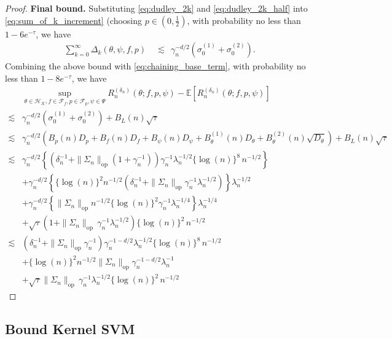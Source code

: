 \documentclass[12pt]{article}
\newcommand{\E}{\mathbb{E}}
\begin{document}
\begin{proof}
\noindent\textbf{Final bound.}
Substituting \eqref{eq:dudley_2k} and \eqref{eq:dudley_2k_half} into \eqref{eq:sum_of_k_increment} (choosing $p\in(0,\frac{1}{2})$, with probability no less than $1-6e^{-\tau}$, we have 
\begin{align*}
\sum_{k=0}^\infty \Delta_k(\theta,\psi,f,p)
&\;\lesssim\; \,\gamma_n^{-d/2}\!\left(\sigma_0^{(1)}+\sigma_0^{(2)}\right).
\end{align*}
Combining the above bound with \eqref{eq:chaining_base_term}, with probability no less than $1-8e^{-\tau}$, we have 
\begin{align*}
&\sup_{\theta\in\mathcal{H}_\mathcal{K}, f\in\mathcal{F}_f, p\in\mathcal{F}_p, \psi\in\Psi}R_n^{(\delta_n)}(\theta;f,p,\psi)-\E[R_n^{(\delta_n)}(\theta;f,p,\psi)]\\
\lesssim &\gamma_n^{-d/2}\!\left(\sigma_0^{(1)}+\sigma_0^{(2)}\right) + B_L(n)\sqrt{\tau}\\
\lesssim & \gamma_n^{-d/2}\!\left(B_p(n) D_{p} + B_f(n)D_{f}+ B_\psi(n)D_{\psi}+ B_\theta^{(1)}(n)D_\theta+B_\theta^{(2)}(n)\sqrt{D_\theta}\right) + B_L(n)\sqrt{\tau}\\
\lesssim & \gamma_n^{-d/2}\left\{\left(\delta_n^{-1}+\|\Sigma_n\|_{\mathrm{op}}(1+\gamma_n^{-1})\right)\gamma_n^{-1}\lambda_n^{-1/2}\{\log(n)\}^{8}\,n^{-1/2}\right\}\\
& + \gamma_n^{-d/2}\left\{\{\log(n)\}^2 n^{-1/2}(\delta_n^{-1}+\|\Sigma_n\|_{\mathrm{op}}\gamma_n^{-1}\lambda_n^{-1/2})\right\}\lambda_n^{-1/2}\\
& + \gamma_n^{-d/2}\left\{\|\Sigma_n\|_{\mathrm{op}}n^{-1/2}\{\log(n)\}^2\gamma_n^{-1}\lambda_n^{-1/4}\right\}\lambda_n^{-1/4}\\
& + \sqrt{\tau} \left(1+\|\Sigma_n\|_{\mathrm{op}}\,\gamma_n^{-1}\lambda_n^{-1/2}\right)\{\log(n)\}^2\,n^{-1/2}\\
\lesssim & \left(\delta_n^{-1}+\|\Sigma_n\|_{\mathrm{op}}\gamma_n^{-1}\right)\gamma_n^{-1-d/2}\lambda_n^{-1/2}\{\log(n)\}^{8}\,n^{-1/2}\\
& + \{\log(n)\}^2 n^{-1/2}\|\Sigma_n\|_{\mathrm{op}}\gamma_n^{-1-d/2}\lambda_n^{-1}\\
& + \sqrt{\tau} \|\Sigma_n\|_{\mathrm{op}}\,\gamma_n^{-1}\lambda_n^{-1/2}\{\log(n)\}^2\,n^{-1/2}
\end{align*}
\end{proof}
\subsection{Bound Kernel SVM}
\end{document}
